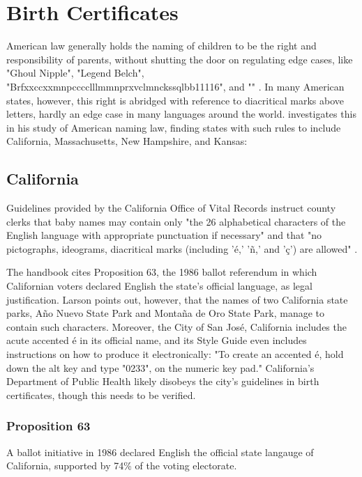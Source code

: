 \section{Birth Certificates}

American law generally holds the naming of children to be the right and
responsibility of parents, without shutting the door on regulating edge cases,
like "Ghoul Nipple", "Legend Belch",
"Brfxxccxxmnpcccclllmmnprxvclmnckssqlbb11116", and "" \parencite{larson11}. In
many American states, however, this right is abridged with reference to
diacritical marks above letters, hardly an edge case in many languages around
the world. \textcite{larson11} investigates this in his study of American
naming law, finding states with such rules to include California, Massachusetts,
New Hampshire, and Kansas:

\subsection{California}

Guidelines provided by the California Office of Vital Records instruct county
clerks that baby names may contain only "the 26 alphabetical characters of the
English language with appropriate punctuation if necessary" and that "no
pictographs, ideograms, diacritical marks (including 'é,' 'ñ,' and 'ç') are
allowed" \parencite{larson11}.

The handbook cites Proposition 63, the 1986 ballot referendum in which
Californian voters declared English the state's official language, as legal
justification. Larson points out, however, that the names of two California
state parks, Año Nuevo State Park and Montaña de Oro State Park, manage to
contain such characters. Moreover, the City of San José, California includes the
acute accented é in its official name, and its Style Guide even includes
instructions on how to produce it electronically: "To create an accented é, hold
down the alt key and type "0233"‚ on the numeric key pad." California's
Department of Public Health likely disobeys the city's guidelines in birth
certificates, though this needs to be verified.

\subsubsection{Proposition 63}

A ballot initiative in 1986 declared English the official state langauge of
California, supported by 74\% of the voting electorate.

